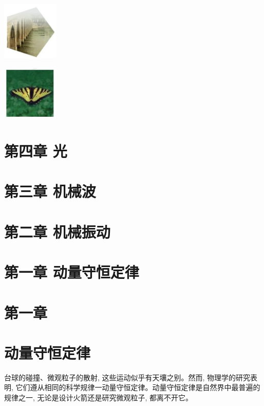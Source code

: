 \documentclass[10pt]{article}
\begin{document}
\begin{center}
\includegraphics[max width=0.2\textwidth]{images/01910e4c-ebb8-7d2c-8f2f-2375bc1d2d12_4_636740.jpg}
\end{center}

\begin{center}
\includegraphics[max width=0.2\textwidth]{images/01910e4c-ebb8-7d2c-8f2f-2375bc1d2d12_4_200795.jpg}
\end{center}

\section*{第四章 光}

\section*{第三章 机械波}

\section*{第二章 机械振动}

\section*{第一章 动量守恒定律}

\section*{第一章}

\section*{动量守恒定律}

台球的碰撞、微观粒子的散射, 这些运动似乎有天壤之别。然而, 物理学的研究表明, 它们遵从相同的科学规律一动量守恒定律。动量守恒定律是自然界中最普遍的规律之一, 无论是设计火箭还是研究微观粒子, 都离不开它。
\end{document}
